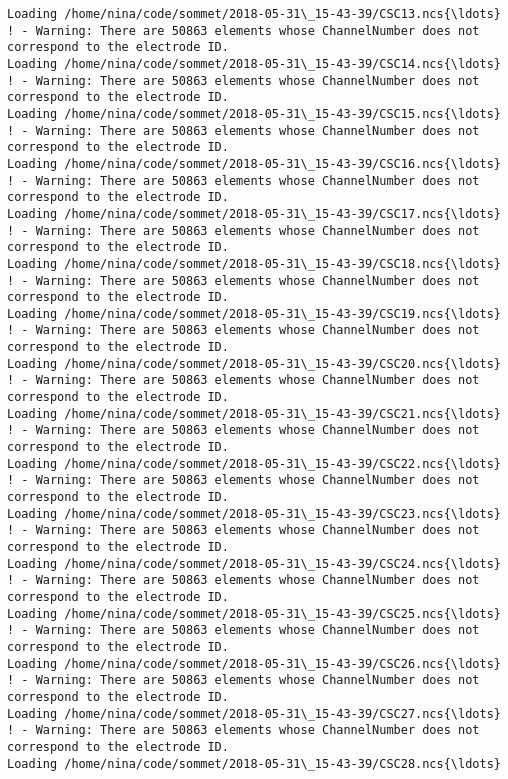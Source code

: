 \documentclass[11pt]{article}
\begin{document}
\begin{Verbatim}[commandchars=\\\{\}]
Loading /home/nina/code/sommet/2018-05-31\_15-43-39/CSC13.ncs{\ldots}
! - Warning: There are 50863 elements whose ChannelNumber does not correspond to the electrode ID.
Loading /home/nina/code/sommet/2018-05-31\_15-43-39/CSC14.ncs{\ldots}
! - Warning: There are 50863 elements whose ChannelNumber does not correspond to the electrode ID.
Loading /home/nina/code/sommet/2018-05-31\_15-43-39/CSC15.ncs{\ldots}
! - Warning: There are 50863 elements whose ChannelNumber does not correspond to the electrode ID.
Loading /home/nina/code/sommet/2018-05-31\_15-43-39/CSC16.ncs{\ldots}
! - Warning: There are 50863 elements whose ChannelNumber does not correspond to the electrode ID.
Loading /home/nina/code/sommet/2018-05-31\_15-43-39/CSC17.ncs{\ldots}
! - Warning: There are 50863 elements whose ChannelNumber does not correspond to the electrode ID.
Loading /home/nina/code/sommet/2018-05-31\_15-43-39/CSC18.ncs{\ldots}
! - Warning: There are 50863 elements whose ChannelNumber does not correspond to the electrode ID.
Loading /home/nina/code/sommet/2018-05-31\_15-43-39/CSC19.ncs{\ldots}
! - Warning: There are 50863 elements whose ChannelNumber does not correspond to the electrode ID.
Loading /home/nina/code/sommet/2018-05-31\_15-43-39/CSC20.ncs{\ldots}
! - Warning: There are 50863 elements whose ChannelNumber does not correspond to the electrode ID.
Loading /home/nina/code/sommet/2018-05-31\_15-43-39/CSC21.ncs{\ldots}
! - Warning: There are 50863 elements whose ChannelNumber does not correspond to the electrode ID.
Loading /home/nina/code/sommet/2018-05-31\_15-43-39/CSC22.ncs{\ldots}
! - Warning: There are 50863 elements whose ChannelNumber does not correspond to the electrode ID.
Loading /home/nina/code/sommet/2018-05-31\_15-43-39/CSC23.ncs{\ldots}
! - Warning: There are 50863 elements whose ChannelNumber does not correspond to the electrode ID.
Loading /home/nina/code/sommet/2018-05-31\_15-43-39/CSC24.ncs{\ldots}
! - Warning: There are 50863 elements whose ChannelNumber does not correspond to the electrode ID.
Loading /home/nina/code/sommet/2018-05-31\_15-43-39/CSC25.ncs{\ldots}
! - Warning: There are 50863 elements whose ChannelNumber does not correspond to the electrode ID.
Loading /home/nina/code/sommet/2018-05-31\_15-43-39/CSC26.ncs{\ldots}
! - Warning: There are 50863 elements whose ChannelNumber does not correspond to the electrode ID.
Loading /home/nina/code/sommet/2018-05-31\_15-43-39/CSC27.ncs{\ldots}
! - Warning: There are 50863 elements whose ChannelNumber does not correspond to the electrode ID.
Loading /home/nina/code/sommet/2018-05-31\_15-43-39/CSC28.ncs{\ldots}

\end{Verbatim}
\end{document}
